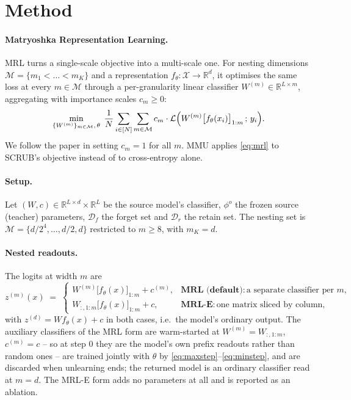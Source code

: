 
\section{Method}

\paragraph{Matryoshka Representation Learning.}
MRL turns a single-scale objective into a multi-scale one. For nesting
dimensions $\mathcal{M} = \{m_1 < \dots < m_K\}$ and a representation
$f_\theta : \mathcal{X} \to \mathbb{R}^{d}$, it optimises the same loss at every
$m \in \mathcal{M}$ through a per-granularity linear classifier
$W^{(m)} \in \mathbb{R}^{L \times m}$, aggregating with importance scales
$c_m \ge 0$:
\begin{equation}
  \min_{\{W^{(m)}\}_{m \in \mathcal{M}},\, \theta} \;
  \frac{1}{N} \sum_{i \in [N]} \sum_{m \in \mathcal{M}}
  c_m \cdot \mathcal{L}\Bigl( W^{(m)} \bigl[f_\theta(x_i)\bigr]_{1:m} \,;\, y_i \Bigr).
  \label{eq:mrl}
\end{equation}
We follow the paper in setting $c_m = 1$ for all $m$. MMU applies
\eqref{eq:mrl} to SCRUB's objective instead of to cross-entropy alone.

\paragraph{Setup.}
Let $(W, c) \in \mathbb{R}^{L \times d} \times \mathbb{R}^{L}$ be the source
model's classifier, $\phi^{o}$ the frozen source (teacher) parameters,
$\mathcal{D}_f$ the forget set and $\mathcal{D}_r$ the retain set. The nesting
set is $\mathcal{M} = \{d/2^{4}, \dots, d/2, d\}$ restricted to $m \ge 8$, with
$m_K = d$.

\paragraph{Nested readouts.}
The logits at width $m$ are
\begin{equation}
  z^{(m)}(x) \;=\;
  \begin{cases}
    W^{(m)} \bigl[f_\theta(x)\bigr]_{1:m} + c^{(m)},
      & \textbf{MRL (default)}: \text{a separate classifier per } m,\\[4pt]
    W_{:,1:m} \bigl[f_\theta(x)\bigr]_{1:m} + c,
      & \textbf{MRL-E}: \text{one matrix sliced by column},
  \end{cases}
  \label{eq:readout}
\end{equation}
with $z^{(d)} = W f_\theta(x) + c$ in both cases, i.e.\ the model's ordinary
output. The auxiliary classifiers of the MRL form are warm-started at
$W^{(m)} \!=\! W_{:,1:m}$, $c^{(m)} \!=\! c$ -- so at step $0$ they are the
model's own prefix readouts rather than random ones -- are trained jointly with
$\theta$ by \eqref{eq:maxstep}--\eqref{eq:minstep}, and are discarded when
unlearning ends; the returned model is an ordinary classifier read at $m = d$.
The MRL-E form adds no parameters at all and is reported as an ablation.

